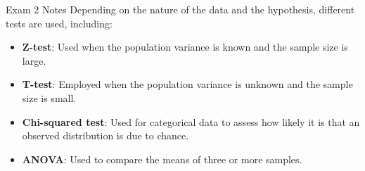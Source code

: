 \begin{examnotes}{Exam 2 Notes}
    Depending on the nature of the data and the hypothesis, different tests are used, including:
    \begin{itemize}
        \item \textbf{Z-test}: Used when the population variance is known and the sample size is large.
        \item \textbf{T-test}: Employed when the population variance is unknown and the sample size is small.
        \item \textbf{Chi-squared test}: Used for categorical data to assess how likely it is that an observed distribution is due to chance.
        \item \textbf{ANOVA}: Used to compare the means of three or more samples.
    \end{itemize}    
\end{examnotes}

